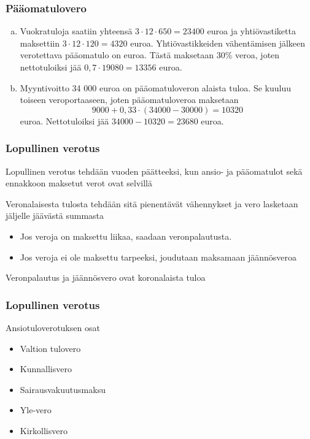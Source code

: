 \documentclass{beamer}
\begin{document}
\begin{frame}
\frametitle{Pääomatulovero}
	\begin{ratkaisu}
		\begin{enumerate}[(a)]
			\item Vuokratuloja saatiin yhteensä \pause \(3\cdot12\cdot650 = 23 400\) euroa ja yhtiövastiketta maksettiin \pause  \(3\cdot12\cdot120 = 4320\) euroa. \pause Yhtiövastikkeiden vähentämisen jälkeen verotettava pääomatulo on  euroa. Tästä maksetaan 30\% veroa, joten nettotuloiksi jää \pause \(0,7\cdot19080=13356\) euroa.\pause
			\item Myyntivoitto 34 000 euroa on pääomatuloveron alaista tuloa. \pause Se kuuluu toiseen veroportaaseen, joten pääomatuloveroa maksetaan\pause
			\[
				9000 + 0,33\cdot(34000-30000) = 10320
			\]
			euroa. \pause Nettotuloiksi jää \(34 000-10320 = 23680\) euroa.
		\end{enumerate}
		
	\end{ratkaisu}
\end{frame}

\begin{frame}
\frametitle{Lopullinen verotus}
\pause
Lopullinen verotus tehdään vuoden päätteeksi, kun ansio- ja pääomatulot sekä ennakkoon maksetut verot ovat selvillä
\begin{block}{}
Veronalaisesta tulosta tehdään sitä pienentävät vähennykset ja vero lasketaan jäljelle jäävästä summasta 
	\begin{itemize}
		\item Jos veroja on maksettu liikaa, saadaan veronpalautusta.
		\item Jos veroja ei ole maksettu tarpeeksi, joudutaan maksamaan jäännösveroa
	\end{itemize}
\end{block}
\pause
Veronpalautus ja jäännösvero ovat koronalaista tuloa
\end{frame}

\begin{frame}
\frametitle{Lopullinen verotus}
\begin{block}{Ansiotuloverotuksen osat}
	\begin{itemize}
		\item Valtion tulovero
		\item Kunnallisvero
		\item Sairausvakuutusmaksu
		\item Yle-vero
		\item Kirkollisvero
	\end{itemize}
\end{block}

\end{frame}
\end{document}
